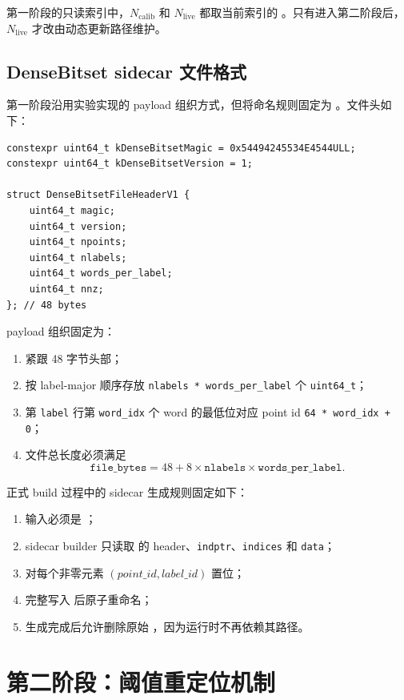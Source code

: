 \documentclass[UTF8]{ctexart}
\begin{document}
第一阶段的只读索引中，\(N_{\text{calib}}\) 和 \(N_{\text{live}}\) 都取当前索引的 。只有进入第二阶段后，\(N_{\text{live}}\) 才改由动态更新路径维护。

\subsection{DenseBitset sidecar 文件格式}
第一阶段沿用实验实现的 payload 组织方式，但将命名规则固定为 。文件头如下：

\begin{verbatim}
constexpr uint64_t kDenseBitsetMagic = 0x54494245534E4544ULL;
constexpr uint64_t kDenseBitsetVersion = 1;

struct DenseBitsetFileHeaderV1 {
	uint64_t magic;
	uint64_t version;
	uint64_t npoints;
	uint64_t nlabels;
	uint64_t words_per_label;
	uint64_t nnz;
}; // 48 bytes
\end{verbatim}

payload 组织固定为：

\begin{enumerate}
\item 紧跟 48 字节头部；
\item 按 label-major 顺序存放 \texttt{nlabels * words\_per\_label} 个 \texttt{uint64\_t}；
\item 第 \texttt{label} 行第 \texttt{word\_idx} 个 word 的最低位对应 point id \texttt{64 * word\_idx + 0}；
\item 文件总长度必须满足
\[
\texttt{file\_bytes} = 48 + 8 \times \texttt{nlabels} \times \texttt{words\_per\_label}.
\]
\end{enumerate}

正式 build 过程中的 sidecar 生成规则固定如下：

\begin{enumerate}
\item 输入必须是 ；
\item sidecar builder 只读取  的 header、\texttt{indptr}、\texttt{indices} 和 \texttt{data}；
\item 对每个非零元素 \((point\_id, label\_id)\) 置位；
\item 完整写入  后原子重命名；
\item 生成完成后允许删除原始 ，因为运行时不再依赖其路径。
\end{enumerate}

\section{第二阶段：阈值重定位机制}
\end{document}
